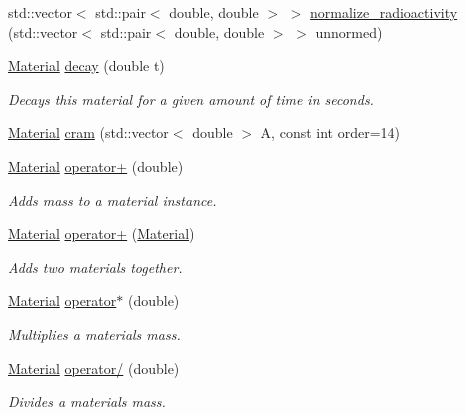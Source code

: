 \begin{DoxyCompactItemize}
\item 
std\+::vector$<$ std\+::pair$<$ double, double $>$ $>$ \hyperlink{classpyne_1_1_material_a114deb10e8d118bbd37ade0fbce5253d}{normalize\+\_\+radioactivity} (std\+::vector$<$ std\+::pair$<$ double, double $>$ $>$ unnormed)
\item 
\mbox{\label{classpyne_1_1_material_a1b9decf23001574896c3413265677307}} 
\hyperlink{classpyne_1_1_material}{Material} \hyperlink{classpyne_1_1_material_a1b9decf23001574896c3413265677307}{decay} (double t)
\begin{DoxyCompactList}\small\item\em Decays this material for a given amount of time in seconds. \end{DoxyCompactList}\item 
\hyperlink{classpyne_1_1_material}{Material} \hyperlink{classpyne_1_1_material_a1276332d8cc094d3cd51f9c933a70a5f}{cram} (std\+::vector$<$ double $>$ A, const int order=14)
\item 
\mbox{\label{classpyne_1_1_material_a97bae8b18322f26e1cd87d8909ce42b6}} 
\hyperlink{classpyne_1_1_material}{Material} \hyperlink{classpyne_1_1_material_a97bae8b18322f26e1cd87d8909ce42b6}{operator+} (double)
\begin{DoxyCompactList}\small\item\em Adds mass to a material instance. \end{DoxyCompactList}\item 
\mbox{\label{classpyne_1_1_material_a1913e1a1b525352bf4f0b4155b6d39b7}} 
\hyperlink{classpyne_1_1_material}{Material} \hyperlink{classpyne_1_1_material_a1913e1a1b525352bf4f0b4155b6d39b7}{operator+} (\hyperlink{classpyne_1_1_material}{Material})
\begin{DoxyCompactList}\small\item\em Adds two materials together. \end{DoxyCompactList}\item 
\mbox{\label{classpyne_1_1_material_a6a924c97822bc791e0b47d4940c8bea3}} 
\hyperlink{classpyne_1_1_material}{Material} \hyperlink{classpyne_1_1_material_a6a924c97822bc791e0b47d4940c8bea3}{operator$\ast$} (double)
\begin{DoxyCompactList}\small\item\em Multiplies a material\textquotesingle{}s mass. \end{DoxyCompactList}\item 
\mbox{\label{classpyne_1_1_material_ac9b6ba67915ed4adb763b1c68ef5eb98}} 
\hyperlink{classpyne_1_1_material}{Material} \hyperlink{classpyne_1_1_material_ac9b6ba67915ed4adb763b1c68ef5eb98}{operator/} (double)
\begin{DoxyCompactList}\small\item\em Divides a material\textquotesingle{}s mass. \end{DoxyCompactList}\end{DoxyCompactItemize}
